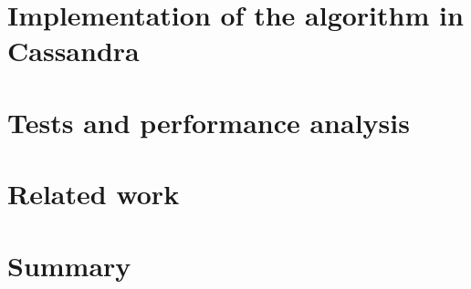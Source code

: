 \documentclass[runningheads,a4paper]{llncs}
\begin{document}
\section{Implementation of the algorithm in Cassandra}

\section{Tests and performance analysis}

\section{Related work}


\section{Summary}



 
\end{document}
